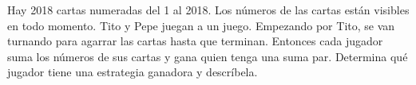 Hay 2018 cartas numeradas del 1 al 2018. Los números de las cartas están visibles en todo momento. Tito y Pepe juegan a un juego. Empezando por Tito, se van turnando para agarrar las cartas hasta que terminan. Entonces cada jugador suma los números de sus cartas y gana quien tenga una suma par. Determina qué jugador tiene una estrategia ganadora y descríbela. \\\\\\\\
